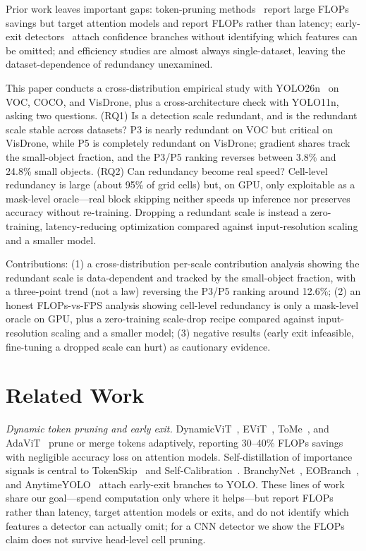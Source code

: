 \documentclass[times,twocolumn,final,authoryear]{elsarticle}
\begin{document}
Prior work leaves important gaps: token-pruning methods~\cite{rao2021dynamicvit,liang2022evit,bolya2023tome,meng2021adavit} report large FLOPs savings but target attention models and report FLOPs rather than latency; early-exit detectors~\cite{teerapittayanon2016branchynet,scholte2025eobranch,anytimeyolo2025} attach confidence branches without identifying which features can be omitted; and efficiency studies are almost always single-dataset, leaving the dataset-dependence of redundancy unexamined.

This paper conducts a cross-distribution empirical study with YOLO26n~\cite{jocher2026ultralyticsyolo26unifiedrealtime} on VOC, COCO, and VisDrone, plus a cross-architecture check with YOLO11n, asking two questions. (RQ1) Is a detection scale redundant, and is the redundant scale stable across datasets? P3 is nearly redundant on VOC but critical on VisDrone, while P5 is completely redundant on VisDrone; gradient shares track the small-object fraction, and the P3/P5 ranking reverses between 3.8\% and 24.8\% small objects. (RQ2) Can redundancy become real speed? Cell-level redundancy is large (about 95\% of grid cells) but, on GPU, only exploitable as a mask-level oracle---real block skipping neither speeds up inference nor preserves accuracy without re-training. Dropping a redundant scale is instead a zero-training, latency-reducing optimization compared against input-resolution scaling and a smaller model.

Contributions: (1) a cross-distribution per-scale contribution analysis showing the redundant scale is data-dependent and tracked by the small-object fraction, with a three-point trend (not a law) reversing the P3/P5 ranking around 12.6\%; (2) an honest FLOPs-vs-FPS analysis showing cell-level redundancy is only a mask-level oracle on GPU, plus a zero-training scale-drop recipe compared against input-resolution scaling and a smaller model; (3) negative results (early exit infeasible, fine-tuning a dropped scale can hurt) as cautionary evidence.

\section{Related Work}\label{sec:related}
\emph{Dynamic token pruning and early exit.} DynamicViT~\cite{rao2021dynamicvit}, EViT~\cite{liang2022evit}, ToMe~\cite{bolya2023tome}, and AdaViT~\cite{meng2021adavit} prune or merge tokens adaptively, reporting 30--40\% FLOPs savings with negligible accuracy loss on attention models. Self-distillation of importance signals is central to TokenSkip~\cite{xia2025tokenskip} and Self-Calibration~\cite{huang2025selfcalib}. BranchyNet~\cite{teerapittayanon2016branchynet}, EOBranch~\cite{scholte2025eobranch}, and AnytimeYOLO~\cite{anytimeyolo2025} attach early-exit branches to YOLO. These lines of work share our goal---spend computation only where it helps---but report FLOPs rather than latency, target attention models or exits, and do not identify which features a detector can actually omit; for a CNN detector we show the FLOPs claim does not survive head-level cell pruning.
\end{document}
